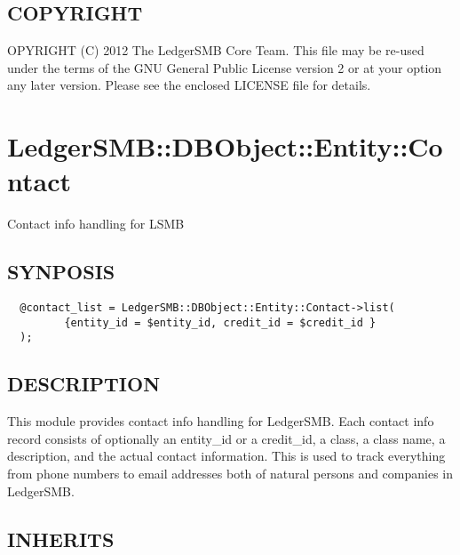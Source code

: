 \begin{description}
\begin{description}
\begin{description}
\begin{description}
\begin{description}
\begin{description}
\begin{description}
\begin{description}
\begin{description}
\end{description}
\subsection*{COPYRIGHT\label{LedgerSMB::DBObject::Entity::Note_COPYRIGHT}}


OPYRIGHT (C) 2012 The LedgerSMB Core Team.  This file may be re-used under the
terms of the GNU General Public License version 2 or at your option any later
version.  Please see the enclosed LICENSE file for details.

\section{LedgerSMB::DBObject::Entity::Contact\label{LedgerSMB::DBObject::Entity::Contact}}


Contact info handling for LSMB

\subsection*{SYNPOSIS\label{LedgerSMB::DBObject::Entity::Contact_SYNPOSIS}}
\begin{verbatim}
  @contact_list = LedgerSMB::DBObject::Entity::Contact->list(
         {entity_id = $entity_id, credit_id = $credit_id }
  );
\end{verbatim}
\subsection*{DESCRIPTION\label{LedgerSMB::DBObject::Entity::Contact_DESCRIPTION}}


This module provides contact info handling for LedgerSMB.  Each contact info
record consists of optionally an entity\_id or a credit\_id, a class, a class
name, a description, and the actual contact information.  This is used to track
everything from phone numbers to email addresses both of natural persons and
companies in LedgerSMB.

\subsection*{INHERITS\label{LedgerSMB::DBObject::Entity::Contact_INHERITS}}
\begin{description}


\end{description}
\end{description}
\end{description}
\end{description}
\end{description}
\end{description}
\end{description}
\end{description}
\end{description}
